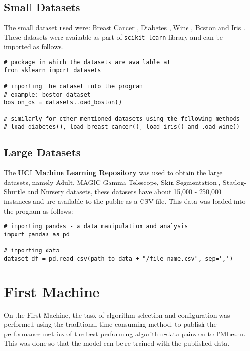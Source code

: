 \subsection*{Small Datasets}

The small dataset used were: Breast Cancer \citep{brendan-et-al}, Diabetes \citep{bradley-et-al}, Wine \citep{lichman:m}, Boston \citep{harrison-et-al} and Iris \citep{fisher:r}. These datasets were available as part of \texttt{scikit-learn} library and can be imported as follows.

\begin{lstlisting}
# package in which the datasets are available at:
from sklearn import datasets

# importing the dataset into the program
# example: boston dataset
boston_ds = datasets.load_boston()

# similarly for other mentioned datasets using the following methods
# load_diabetes(), load_breast_cancer(), load_iris() and load_wine()

\end{lstlisting}

\subsection*{Large Datasets}

The \textbf{UCI Machine Learning Repository} \citep{Dua:2019} was used to obtain the large datasets, namely Adult, MAGIC Gamma Telescope, Skin Segmentation \citep{skin-ds}, Statlog-Shuttle and Nursery \citep{Dua:2019} datasets, these datasets have about 15,000 - 250,000 instances and are available to the public as a CSV file. This data was loaded into the program as follows:

\begin{lstlisting}
# importing pandas - a data manipulation and analysis
import pandas as pd

# importing data
dataset_df = pd.read_csv(path_to_data + "/file_name.csv", sep=',')

\end{lstlisting}

\section*{First Machine}

On the First Machine, the task of algorithm selection and configuration was performed using the traditional time consuming method, to publish the performance metrics of the best performing algorithm-data pairs on to FMLearn. This was done so that the model can be re-trained with the published data.

